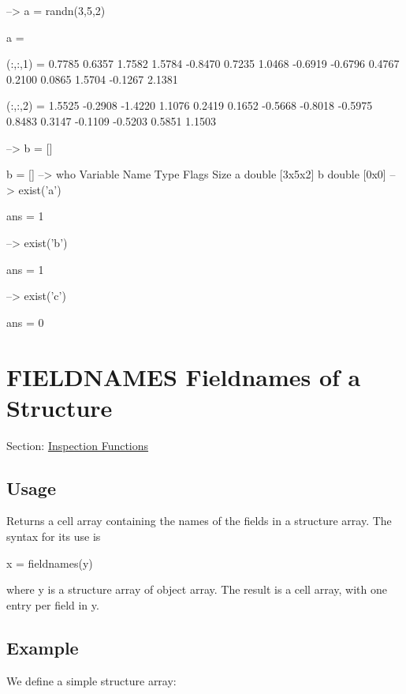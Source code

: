 \begin{DoxyVerbInclude}
--> a = randn(3,5,2)

a = 

(:,:,1) = 
    0.7785    0.6357    1.7582    1.5784   -0.8470 
    0.7235    1.0468   -0.6919   -0.6796    0.4767 
    0.2100    0.0865    1.5704   -0.1267    2.1381 

(:,:,2) = 
    1.5525   -0.2908   -1.4220    1.1076    0.2419 
    0.1652   -0.5668   -0.8018   -0.5975    0.8483 
    0.3147   -0.1109   -0.5203    0.5851    1.1503 

--> b = []

b = 
  []
--> who
  Variable Name       Type   Flags             Size
              a    double                    [3x5x2]
              b    double                    [0x0]
--> exist('a')

ans = 
 1 

--> exist('b')

ans = 
 1 

--> exist('c')

ans = 
 0 
\end{DoxyVerbInclude}
 \hypertarget{inspection_fieldnames}{}\section{F\-I\-E\-L\-D\-N\-A\-M\-E\-S Fieldnames of a Structure}\label{inspection_fieldnames}
Section\-: \hyperlink{sec_inspection}{Inspection Functions} \hypertarget{vtkwidgets_vtkxyplotwidget_Usage}{}\subsection{Usage}\label{vtkwidgets_vtkxyplotwidget_Usage}
Returns a cell array containing the names of the fields in a structure array. The syntax for its use is \begin{DoxyVerb}   x = fieldnames(y)
\end{DoxyVerb}
 where {\ttfamily y} is a structure array of object array. The result is a cell array, with one entry per field in {\ttfamily y}. \hypertarget{variables_struct_Example}{}\subsection{Example}\label{variables_struct_Example}
We define a simple structure array\-:


